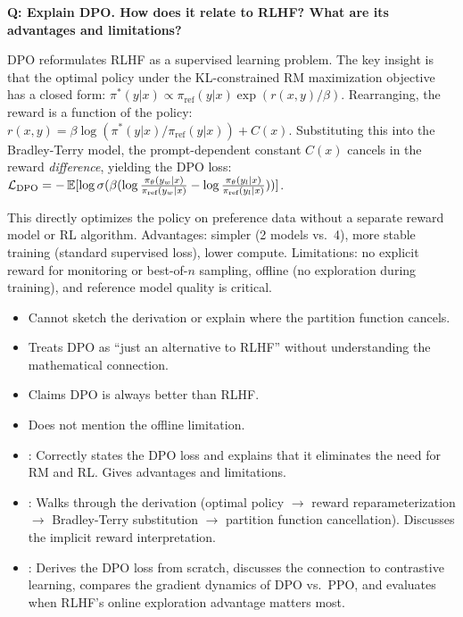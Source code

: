 \begin{interviewq}
\textbf{Q: Explain DPO.  How does it relate to RLHF?  What are its
advantages and limitations?}

 \quad {} \quad
\badgefreq{\freqhigh}

\stronganswer
DPO reformulates RLHF as a supervised learning problem.  The key insight
is that the optimal policy under the KL-constrained RM maximization
objective has a closed form:
$\pi^*(y|x) \propto \pi_{\text{ref}}(y|x) \exp(r(x,y)/\beta)$.  Rearranging,
the reward is a function of the policy:
$r(x,y) = \beta \log(\pi^*(y|x)/\pi_{\text{ref}}(y|x)) + C(x)$.
Substituting this into the Bradley-Terry model, the prompt-dependent
constant $C(x)$ cancels in the reward \emph{difference}, yielding the DPO
loss:
$\mathcal{L}_{\text{DPO}} = -\operatorname{\mathbb{E}}[\log \sigma(\beta(\log \frac{\pi_\theta(y_w|x)}{\pi_{\text{ref}}(y_w|x)} - \log \frac{\pi_\theta(y_l|x)}{\pi_{\text{ref}}(y_l|x)}))]$.

This directly optimizes the policy on preference data without a separate
reward model or RL algorithm.  Advantages: simpler (2 models vs.\ 4),
more stable training (standard supervised loss), lower compute.
Limitations: no explicit reward for monitoring or best-of-$n$ sampling,
offline (no exploration during training), and reference model quality
is critical.

\redflags
\begin{itemize}
\item Cannot sketch the derivation or explain where the partition
  function cancels.
\item Treats DPO as ``just an alternative to RLHF'' without understanding
  the mathematical connection.
\item Claims DPO is always better than RLHF.
\item Does not mention the offline limitation.
\end{itemize}


\goodgreat
\begin{itemize}
\item {}: Correctly states the DPO loss and explains that
  it eliminates the need for RM and RL.  Gives advantages and limitations.
\item {}: Walks through the derivation (optimal policy $\to$
  reward reparameterization $\to$ Bradley-Terry substitution $\to$
  partition function cancellation).  Discusses the implicit reward
  interpretation.
\item {}: Derives the DPO loss from scratch, discusses
  the connection to contrastive learning, compares the gradient dynamics
  of DPO vs.\ PPO, and evaluates when RLHF's online exploration
  advantage matters most.
\end{itemize}

\end{interviewq}

